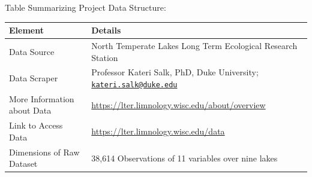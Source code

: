 \documentclass[12pt,]{article}
\begin{document}
Table Summarizing Project Data Structure:

\begin{longtable}[]{@{}ll@{}}
\toprule
\begin{minipage}[b]{0.33\columnwidth}\raggedright\strut
Element\strut
\end{minipage} & \begin{minipage}[b]{0.61\columnwidth}\raggedright\strut
Details\strut
\end{minipage}\tabularnewline
\midrule
\endhead
\begin{minipage}[t]{0.33\columnwidth}\raggedright\strut
Data Source\strut
\end{minipage} & \begin{minipage}[t]{0.61\columnwidth}\raggedright\strut
North Temperate Lakes Long Term Ecological Research Station\strut
\end{minipage}\tabularnewline
\begin{minipage}[t]{0.33\columnwidth}\raggedright\strut
Data Scraper\strut
\end{minipage} & \begin{minipage}[t]{0.61\columnwidth}\raggedright\strut
Professor Kateri Salk, PhD, Duke University;
\href{mailto:kateri.salk@duke.edu}{\nolinkurl{kateri.salk@duke.edu}}\strut
\end{minipage}\tabularnewline
\begin{minipage}[t]{0.33\columnwidth}\raggedright\strut
More Information about Data\strut
\end{minipage} & \begin{minipage}[t]{0.61\columnwidth}\raggedright\strut
\url{https://lter.limnology.wisc.edu/about/overview}\strut
\end{minipage}\tabularnewline
\begin{minipage}[t]{0.33\columnwidth}\raggedright\strut
Link to Access Data\strut
\end{minipage} & \begin{minipage}[t]{0.61\columnwidth}\raggedright\strut
\url{https://lter.limnology.wisc.edu/data}\strut
\end{minipage}\tabularnewline
\begin{minipage}[t]{0.33\columnwidth}\raggedright\strut
Dimensions of Raw Dataset\strut
\end{minipage} & \begin{minipage}[t]{0.61\columnwidth}\raggedright\strut
38,614 Observations of 11 variables over nine lakes\strut
\end{minipage}\tabularnewline

\end{longtable}
\end{document}

